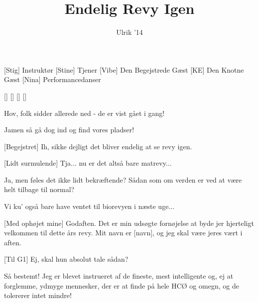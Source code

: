 \documentclass[a4paper,11pt]{article}
\title{Endelig Revy Igen}
\author{Ulrik '14}
\begin{document}
\maketitle

\begin{roles}
[Stig] Instruktør
[Stine] Tjener
[Vibe] Den Begejstrede Gæst
[KE] Den Knotne Gæst
[Nina] Performancedanser
\end{roles}

\begin{props}
[]
[]
[]
[]
\end{props}


\begin{sketch}



 Hov, folk sidder allerede ned - de er vist gået i gang!

 Jamen så gå dog ind og find vores pladser!

[Begejstret] Ih, sikke dejligt det bliver endelig at se revy igen.

[Lidt surmulende] Tja... nu er det altså bare matrevy...

 Ja, men føles det ikke lidt bekræftende? Sådan som om verden er ved at være helt tilbage til normal?

 Vi ku' også bare have ventet til biorevyen i næste uge...



[Med ophøjet mine] Godaften. Det er min udsøgte fornøjelse at byde jer hjerteligt velkommen til dette års revy. Mit navn er [navn], og jeg skal være jeres vært i aften.

[Til G1] Ej, skal hun absolut tale sådan?

 Så bestemt! Jeg er blevet instrueret af de fineste, mest intelligente og, ej at forglemme, ydmyge mennesker, der er at finde på hele HCØ og omegn, og de tolererer intet mindre!


\end{sketch}
\end{document}

